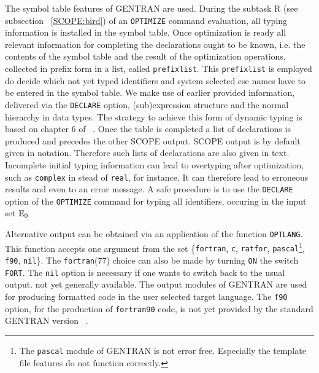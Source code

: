 The symbol table features of GENTRAN are used. During the subtask
R (see subsection ~\ref{SCOPE:bird}) of an {\tt OPTIMIZE} command evaluation,
all typing information is installed in the symbol table. Once optimization
is ready all relevant information for completing the declarations ought to
be known, i.e. the contents of the symbol table and the result of the
optimization operations, collected in prefix form in a list,
called {\tt prefixlist}. This {\tt prefixlist} is employed do decide which not yet typed identifiers and system selected cse names have to be entered in the
symbol table. We make use of earlier provided information, delivered via the
{\tt DECLARE} option, (sub)expression structure and the normal hierarchy in data
types. The strategy to achieve this form of dynamic typing is based on
chapter 6 of ~\cite{Aho:86}.
Once the table is completed a list of declarations is produced and precedes the
other SCOPE output. SCOPE output is by default given in {\REDUCE} notation.
Therefore such lists of declarations are also given in {\REDUCE} text.
Incomplete initial typing information can lead to overtyping after
optimization, such as {\tt complex} in stead of {\tt real}, for instance.
It can therefore lead to erroneous results and even to an error message.
A safe procedure is to
use the {\tt DECLARE} option of the {\tt OPTIMIZE} command for typing
all identifiers, occuring in the input set ${\rm E}_0$

Alternative output can be obtained via an application of the function
{\tt OPTLANG}. This function accepts one argument from the set \{{\tt fortran},
{\tt c}, {\tt ratfor}, {\tt pascal}\footnote{The {\tt pascal} module of
GENTRAN is not error free. Especially the template file features do not
function correctly.}, {\tt f90}, {\tt nil}\}.
The {\tt fortran}(77) choice can also be made by turning {\tt ON} the
switch {\tt FORT}. The {\tt nil} option is necessary if one wants to
switch back to the usual {\REDUCE} output.
not yet generally available. The output modules of GENTRAN are used for
producing formatted code in the user selected target language. The
{\tt f90} option, for the production of {\tt fortran90} code,
is not yet provided by the standard GENTRAN version ~\cite{Borst:94}.

